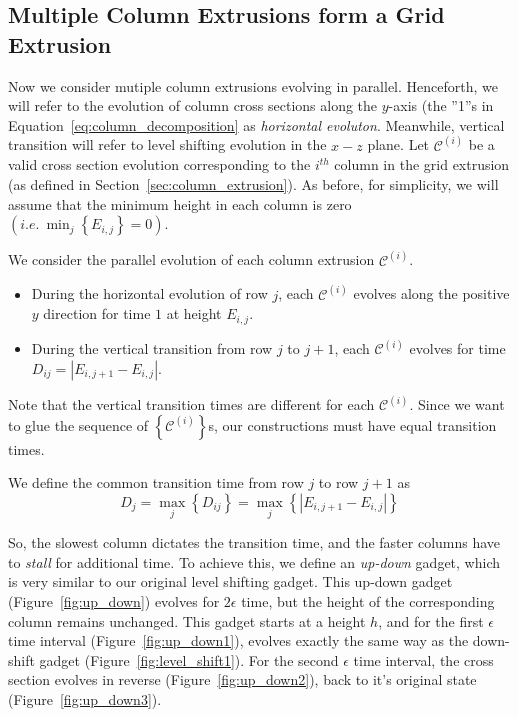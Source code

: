 \subsection{Multiple Column Extrusions form a Grid Extrusion}
\label{sec:grid_extrusion}

Now we consider mutiple column extrusions evolving in parallel.
Henceforth, we will refer to the evolution of column cross sections along the $y$-axis
(the ''1''s in Equation~\ref{eq:column_decomposition} as \emph{horizontal evoluton}.
Meanwhile, vertical transition will refer to level shifting evolution in the $x-z$ plane.
Let $\mathcal C^{(i)}$ be a valid cross section evolution corresponding
to the $i^{th}$ column in the grid extrusion (as defined in Section~\ref{sec:column_extrusion}).
As before, for simplicity, we will assume that the minimum height in each column is zero $\left( i.e.\ \min_j\left\{ E_{i,j}\right\} = 0 \right)$.

%

We consider the parallel evolution of each column extrusion $\mathcal C^{(i)}$.
\begin{itemize}
    \item During the horizontal evolution of row $j$, each $\mathcal C^{(i)}$ evolves along the positive $y$ direction for time $1$ at height $E_{i,j}$.
    \item During the vertical transition from row $j$ to $j+1$, each $\mathcal C^{(i)}$ evolves for time $ D_{ij} = \left| E_{i,j+1}-E_{i,j}\right|$.
\end{itemize}
Note that the vertical transition times are different for each $\mathcal C^{(i)}$.
Since we want to glue the sequence of $\left\{ \mathcal C^{(i)}\right\}$s, our constructions must have equal transition times.

\begin{definition}
\label{def:slowest_column}
We define the common transition time from row $j$ to row $j+1$ as
$$D_j = \max_j\left\{ D_{ij}\right\} = \max_j\left\{ \left| E_{i,j+1}-E_{i,j}\right|\right\}$$
\end{definition}

So, the slowest column dictates the transition time, and the faster columns have to \emph{stall} for additional time.
To achieve this, we define an \emph{up-down} gadget, which is very similar to our original level shifting gadget.
This up-down gadget (Figure~\ref{fig:up_down}) evolves for $2\epsilon$ time, but the height of the corresponding column remains unchanged.
This gadget starts at a height $h$, and for the first $\epsilon$ time interval (Figure~\ref{fig:up_down1}),
evolves exactly the same way as the down-shift gadget (Figure~\ref{fig:level_shift1}).
For the second $\epsilon$ time interval, the cross section evolves in reverse (Figure~\ref{fig:up_down2}),
back to it's original state (Figure~\ref{fig:up_down3}).

